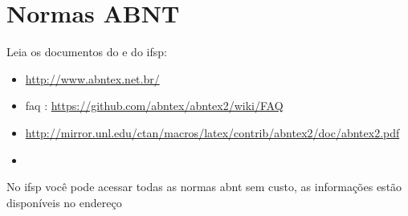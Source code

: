 \section{Normas ABNT}

Leia os documentos do \abnTeX e do \ac{ifsp}:
\begin{itemize}
    \item \url{http://www.abntex.net.br/}
    
    \item \acs{faq} : \url{https://github.com/abntex/abntex2/wiki/FAQ}
    
    \item \url{http://mirror.unl.edu/ctan/macros/latex/contrib/abntex2/doc/abntex2.pdf}
    
    \item {}
\end{itemize}

No \ac{ifsp} você pode acessar todas as normas \ac{abnt} sem custo, as informações estão disponíveis no endereço 

